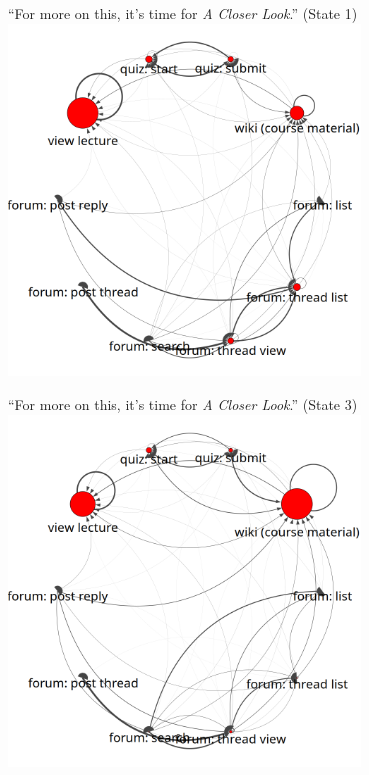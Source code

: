 \documentclass[10pt]{beamer}
\begin{document}
\begin{frame}{``For more on this, it's time for \emph{A Closer Look}.''
    (State 1)}
  \centering
  \includegraphics[width=0.70\textwidth]{../figures/text-4state/state1.png}
\end{frame}

\begin{frame}{``For more on this, it's time for \emph{A Closer Look}.''
    (State 3)}
  \centering
  \includegraphics[width=0.70\textwidth]{../figures/text-4state/state3.png}
\end{frame}
\end{document}
